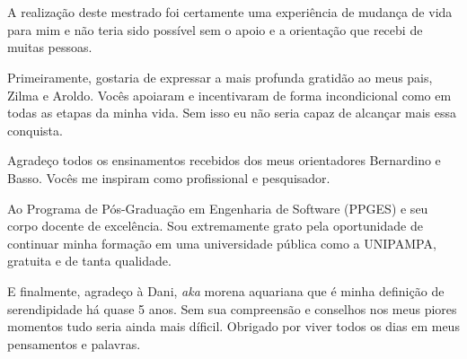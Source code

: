 \begin{agradecimentos}
\\~\\
A realização deste mestrado foi certamente uma experiência de mudança de vida para mim e não teria sido possível sem o apoio e a orientação que recebi de muitas pessoas.

Primeiramente, gostaria de expressar a mais profunda gratidão ao meus pais, Zilma e Aroldo. Vocês apoiaram e incentivaram de forma incondicional como em todas as etapas da minha vida. Sem isso eu não seria capaz de alcançar mais essa conquista.

Agradeço todos os ensinamentos recebidos dos meus orientadores Bernardino e Basso. Vocês me inspiram como profissional e pesquisador.

Ao Programa de Pós-Graduação em Engenharia de Software (PPGES) e seu corpo docente de excelência. 
Sou extremamente grato pela oportunidade de continuar minha formação em uma universidade pública como a UNIPAMPA, gratuita e de tanta qualidade.

E finalmente, agradeço à Dani, \textit{aka} morena aquariana que é minha definição de serendipidade há quase 5 anos. 
Sem sua compreensão e conselhos nos meus piores momentos tudo seria ainda mais díficil.
Obrigado por viver todos os dias em meus pensamentos e palavras.

\end{agradecimentos}